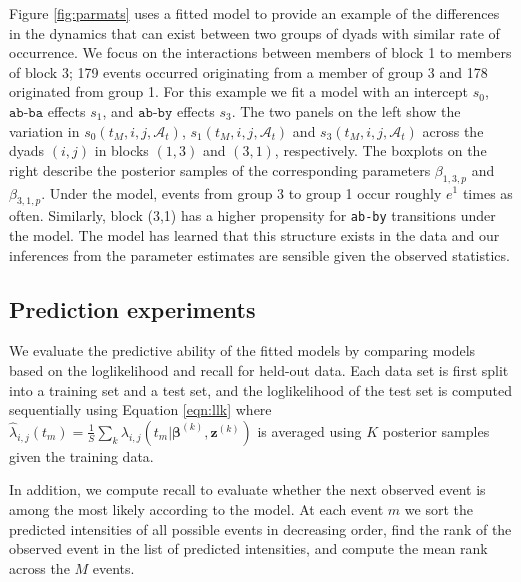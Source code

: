 Figure \ref{fig:parmats} uses a fitted model to provide an example of the differences in the dynamics that can exist between two groups of dyads with similar rate of occurrence.
We focus on the interactions between members of block 1 to members of block 3; 179 events occurred originating from a member of group 3 and 178 originated from group 1.
For this example we fit a model with an intercept $s_0$, $\texttt{ab-ba}$ effects $s_1$, and $\texttt{ab-by}$ effects $s_3$.
The two panels on the left show the variation in $s_0(t_M,i,j,\mathcal{A}_t)$, $s_1(t_M,i,j,\mathcal{A}_t)$ and $s_3(t_M,i,j,\mathcal{A}_t)$ across the dyads $(i,j)$ in blocks $(1,3)$ and $(3,1)$, respectively.
The boxplots on the right describe the posterior samples of the corresponding parameters $\beta_{1,3,p}$ and $\beta_{3,1,p}$.
Under the model, events from group 3 to group 1 occur roughly $e^1$ times as often.
Similarly, block (3,1) has a higher propensity for \texttt{ab-by} transitions under the model.
The model has learned that this structure exists in the data and our inferences from the parameter estimates are sensible given the observed statistics.

\subsection{Prediction experiments}

We evaluate the predictive ability of the fitted models by comparing models based on the loglikelihood and recall for held-out data.
Each data set is first split into a training set and a test set, and the loglikelihood of the test set is computed sequentially using Equation \ref{eqn:llk} where $\hat{\lambda}_{i,j}(t_m) = \frac{1}{S}\sum_k \lambda_{i,j}(t_m | \boldsymbol{\beta}^{(k)}, \mathbf{z}^{(k)})$ is averaged using $K$ posterior samples given the training data.

In addition, we compute recall to evaluate whether the next observed event is among the most likely according to the model.
At each event $m$ we sort the predicted intensities of all possible events in decreasing order, find the rank of the observed event in the list of predicted intensities, and compute the mean rank across the $M$ events.

